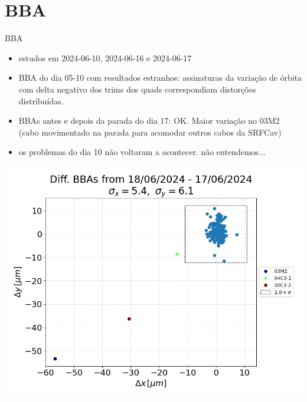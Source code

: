 \section{BBA}



\begin{frame}{BBA}
\vspace{-0.2cm}
{\footnotesize
\begin{itemize}
    \setlength\itemsep{0.5em}
    \item estudos em 2024-06-10, 2024-06-16 e 2024-06-17
    \item BBA do dia 05-10 com resultados estranhos: assinaturas da variação de órbita com delta negativo dos trims dos quads correspondiam distorções distribuídas.
    \item BBAs antes e depois da parada do dia 17: OK. Maior variação no 03M2 (cabo movimentado na parada para acomodar outros cabos da SRFCav)
    \item os problemas do dia 10 não voltaram a acontecer. não entendemos...
\end{itemize}
}
\centering
\includegraphics[width=0.4\linewidth]{2024-07-12/figures/diff_to_bba_orb_before_2024_06_17_shutdown.png}
\end{frame}